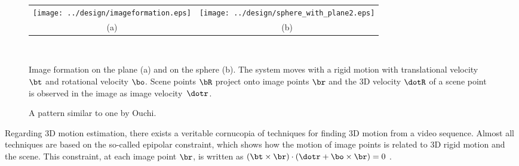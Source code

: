 \documentclass[10pt,twocolumn]{article}
\begin{document}
\begin{figure*}[htbp]
  \centering
  \begin{minipage}[b]{\textwidth}
    \begin{minipage}[b]{0.65\textwidth}
  \centering
  \begin{tabular}[b]{cc}
    \texttt{[image: ../design/imageformation.eps]}
&
    \texttt{[image: ../design/sphere\_with\_plane2.eps]} 
\\ %
(a) & (b)
  \end{tabular}
    \end{minipage}\hfill%
    \begin{minipage}[b]{0.32\textwidth}
  \vspace*{-1.5cm}
  \centerline{\epsfysize=6.5cm}
    \end{minipage}\\
    \begin{minipage}[t]{0.65\textwidth}
  \caption{Image formation on the plane (a) and on the sphere (b). The
  system moves with a rigid motion with translational velocity $\bt$
  and rotational velocity $\bo$. Scene points $\bR$ project onto image
  points $\br$ and the 3D velocity $\dotR$ of a scene point is
  observed in the image as image velocity~$\dotr$.}
  \label{fig:imageformation}
    \end{minipage}\hspace*{0.05\textwidth}%
    \begin{minipage}[t]{0.32\textwidth}
  \caption{A pattern similar to one by Ouchi.}
  \label{fig:ouchi}
    \end{minipage}%
  \end{minipage}
\end{figure*}

Regarding 3D motion estimation, there exists a veritable cornucopia of techniques for finding 3D
motion from a video sequence. Almost all techniques are based on the so-called epipolar
constraint, which shows how the motion of image points is related to
3D rigid motion and the scene. This constraint, at each image point
$\br$, is written as $(\bt \times \br ) \cdot (\dotr + \bo \times \br
) = 0$ \cite{Kosta96}.
\end{document}

